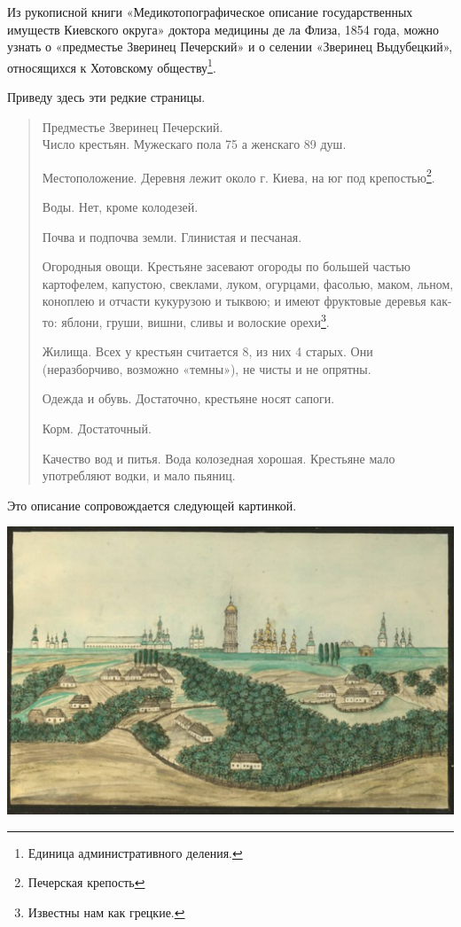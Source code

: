 Из рукописной книги «Медикотопографическое описание государственных имуществ Киевского округа» доктора медицины де ла Флиза, 1854 года, можно узнать о «предместье Зверинец Печерский» и о селении «Зверинец Выдубецкий», относящихся к Хотовскому обществу\footnote{Единица административного деления.}.

Приведу здесь эти редкие страницы.

\begin{quotation}
Предместье Зверинец Печерский.\\

Число крестьян. Мужескаго пола 75 а женскаго 89 душ.

Местоположение. Деревня лежит около г. Киева, на юг под крепостью\footnote{Печерская крепость}.

Воды. Нет, кроме колодезей.

Почва и подпочва земли. Глинистая и песчаная.

Огородныя овощи. Крестьяне засевают огороды по большей частью картофелем, капустою, свеклами, луком, огурцами, фасолью, маком, льном, коноплею и отчасти кукурузою и тыквою; и имеют фруктовые деревья как-то: яблони, груши, вишни, сливы и волоские орехи\footnote{Известны нам как грецкие.}.

Жилища. Всех у крестьян считается 8, из них 4 старых. Они (неразборчиво, возможно «темны»), не чисты и не опрятны.

Одежда и обувь. Достаточно, крестьяне носят сапоги.

Корм. Достаточный.

Качество вод и питья. Вода колозедная хорошая. Крестьяне мало употребляют водки, и мало пьяниц.
\end{quotation}

Это описание сопровождается следующей картинкой.

\begin{center}
\includegraphics[width=\linewidth]{chast-vosp/zver/zver-pech.jpg}
\end{center}

